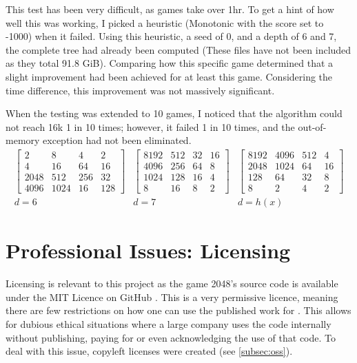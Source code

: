 \documentclass{article}
\begin{document}
This test has been very difficult, as games take over 1hr. To get a hint of how well this was working, I picked a heuristic (Monotonic with the score set to -1000) when it failed. Using this heuristic, a seed of 0, and a depth of 6 and 7, the complete tree had already been computed (These files have not been included as they total 91.8 GiB). Comparing how this specific game determined that a slight improvement had been achieved for at least this game. Considering the time difference, this improvement was not massively significant.  

When the testing was extended to 10 games, I noticed that the algorithm could not reach 16k 1 in 10 times; however, it failed 1 in 10 times, and the out-of-memory exception had not been eliminated.
\[
\begin{matrix}
\begin{bmatrix}
    2&8&4&2 \\
    4&16&64&16 \\
    2048&512&256&32\\ 
    4096&1024&16&128 
\end{bmatrix}&
\begin{bmatrix}
    8192&512&32&16 \\
    4096&256&64&8 \\
    1024&128&16&4 \\
    8&16&8&2 
\end{bmatrix}&
\begin{bmatrix}
    8192&4096&512&4\\
    2048&1024&64&16\\
    128&64&32&8\\
    8&2&4&2
\end{bmatrix}
\\
d=6&d=7&d=h(x)
\end{matrix}
\]
\section{Professional Issues: Licensing}
\label{sec:prof_issues}
Licensing is relevant to this project as the game 2048's source code is available under the MIT Licence on GitHub \cite{source2048}. This is a very permissive licence, meaning there are few restrictions on how one can use the published work for \cite{osi_faq}. This allows for dubious ethical situations where a large company uses the code internally without publishing, paying for or even acknowledging the use of that code. To deal with this issue, copyleft licenses were created (see \ref{subsec:oss}).
\end{document}
